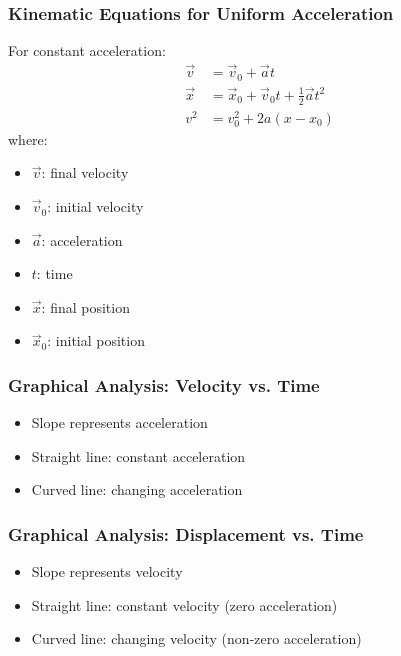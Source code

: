 \documentclass{beamer}
\begin{document}
\begin{frame}
\frametitle{Kinematic Equations for Uniform Acceleration}
For constant acceleration:
\begin{align*}
\vec{v} &= \vec{v}_0 + \vec{a}t \\
\vec{x} &= \vec{x}_0 + \vec{v}_0 t + \tfrac{1}{2} \vec{a} t^2 \\
v^2 &= v_0^2 + 2a (x - x_0)
\end{align*}
where:
\begin{itemize}
    \item $\vec{v}$: final velocity
    \item $\vec{v}_0$: initial velocity
    \item $\vec{a}$: acceleration
    \item $t$: time
    \item $\vec{x}$: final position
    \item $\vec{x}_0$: initial position
\end{itemize}
\end{frame}

\begin{frame}
\frametitle{Graphical Analysis: Velocity vs. Time}
\begin{itemize}
    \item Slope represents acceleration
    \item Straight line: constant acceleration
    \item Curved line: changing acceleration
\end{itemize}
\end{frame}

\begin{frame}
\frametitle{Graphical Analysis: Displacement vs. Time}
\begin{itemize}
    \item Slope represents velocity
    \item Straight line: constant velocity (zero acceleration)
    \item Curved line: changing velocity (non-zero acceleration)
\end{itemize}
\end{frame}
\end{document}
